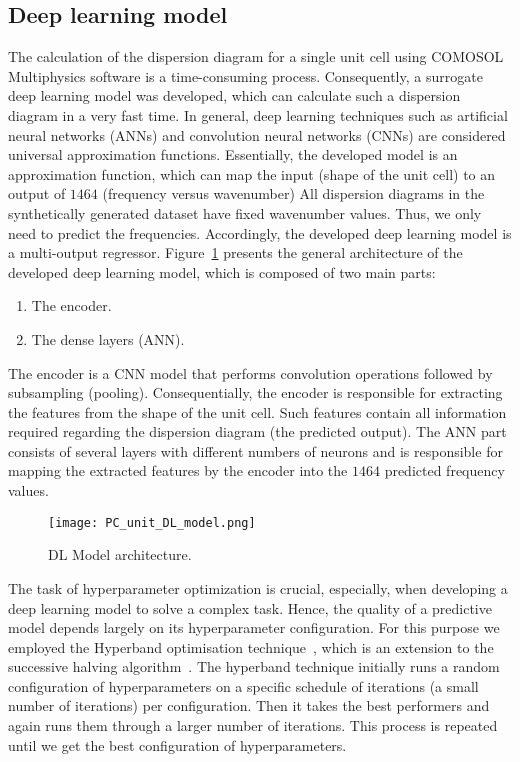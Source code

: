 \documentclass[11pt,a4paper]{report}
\begin{document}
\begin{sloppypar}
		\subsection{Deep learning model}
		\noindent
		The calculation of the dispersion diagram for a single unit cell using COMOSOL Multiphysics software is a time-consuming process.		
		Consequently, a surrogate deep learning model was developed, which can calculate such a dispersion diagram in a very fast time.
		In general, deep learning techniques such as artificial neural networks (ANNs) and convolution neural networks (CNNs) are considered universal approximation functions.
		\noindent Essentially, the developed model is an approximation function, which can map the input (shape of the unit cell) to an output of \(1464\) (frequency versus wavenumber) 
		All dispersion diagrams in the synthetically generated dataset have fixed wavenumber values.
		Thus, we only need to predict the frequencies.		
		Accordingly, the developed deep learning model is a multi-output regressor.		
		Figure~\ref{DL_model} presents the general architecture of the developed deep learning model, which is composed of two main parts:		
		\begin{enumerate}
			\item The encoder.
			\item The dense layers (ANN).
		\end{enumerate}
		The encoder is a CNN model that performs convolution operations followed by subsampling (pooling). 		
		Consequentially, the encoder is responsible for extracting the features from the shape of the unit cell.
		Such features contain all information required regarding the dispersion diagram (the predicted output).
		The ANN part consists of several layers with different numbers of neurons and is responsible for mapping the extracted features by the encoder into the \(1464\) predicted frequency values.
		\begin{figure}
			\centering
			\texttt{[image: PC\_unit\_DL\_model.png]}
			\caption{DL Model architecture.}
			\label{DL_model}
		\end{figure}
		The task of hyperparameter optimization is crucial, especially, when developing a deep learning model to solve a complex task.
		Hence, the quality of a predictive model depends largely on its hyperparameter configuration.
		For this purpose we employed the Hyperband optimisation technique~\cite{Li2018}, which is an extension to the successive halving algorithm~\cite{Jamieson2016}.
		The hyperband technique initially runs a random configuration of hyperparameters on a specific schedule of iterations (a small number of iterations) per configuration.
		Then it takes the best performers and again runs them through a larger number of iterations.
		This process is repeated until we get the best configuration of hyperparameters.
		

\end{sloppypar}
\end{document}
